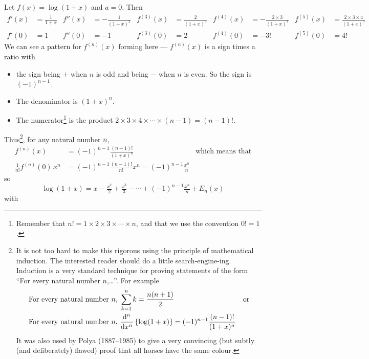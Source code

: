 \begin{eg}\label{eg:bigohlog}
Let $f(x)=\log(1+x)$ and $a=0$. Then
\begin{align*}
f'(x)&=\tfrac{1}{1+x} &
f''(x)&=-\tfrac{1}{(1+x)^2} &
f^{(3)}(x)&=\tfrac{2}{(1+x)^3} &
f^{(4)}(x)&=-\tfrac{2\times 3}{(1+x)^4} &
f^{(5)}(x)&=\tfrac{2\times 3\times 4}{(1+x)^5} \\
f'(0)&=1 &
f''(0)&=-1 &
f^{(3)}(0)&=2 &
f^{(4)}(0)&=-3! &
f^{(5)}(0)&=4!
\end{align*}
We can see a pattern for $f^{(n)}(x)$ forming here --- $f^{(n)}(x)$ is
a sign times a ratio with
\begin{itemize} \itemsep1pt \parskip0pt  \itemindent-15pt
\item the sign being $+$ when $n$ is odd and being $-$ when $n$ is even.
So the sign is $(-1)^{n-1}$.
\item The denominator is $(1+x)^n$.
\item The numerator\footnote{Remember that $n! = 1\times 2\times 3\times \cdots\times n$, and that we use the
convention $0!=1$.} is the product $2\times 3\times 4\times \cdots \times (n-1)
 = (n-1)!$.
\end{itemize}
Thus\footnote{It is not too hard to make this rigorous using the principle
of mathematical induction. The interested
reader should do a little search-engine-ing. Induction is a very standard technique for proving statements of the
form ``For every natural number $n$,\dots''. For example
\begin{align*}
  \text{For every natural number $n$, }& \sum_{k=1}^n k = \frac{n(n+1)}{2} & \text{or}\\
  \text{For every natural number $n$, }& \frac{\mathrm{d}^n}{\mathrm{d}{x}^n} \left\{ \log(1+x)\right\} = (-1)^{n-1} \frac{(n-1)!}{(1+x)^n}
\end{align*}
It was also used by Polya (1887--1985) to give a very convincing (but subtly (and deliberately) flawed)
proof that all horses have the same colour.}, for any natural number $n$,
\begin{align*}
f^{(n)}(x)&=(-1)^{n-1}\tfrac{(n-1)!}{(1+x)^n} & \text{which means that}\\
\tfrac{1}{n!}f^{(n)}(0)\,x^n &= (-1)^{n-1}\tfrac{(n-1)!}{n!}x^n
   = (-1)^{n-1}\tfrac{x^n}{n}
\end{align*}
so
\begin{equation*}
\log(1+x) = x-\tfrac{x^2}{2}+\tfrac{x^3}{3}-\cdots +(-1)^{n-1}\tfrac{x^n}{n}
+E_n(x)
\end{equation*}
with
\begin{equation*}

\end{equation*}
\end{eg}
